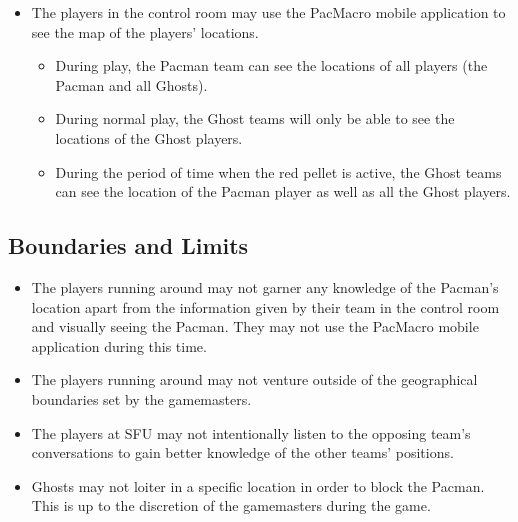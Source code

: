 \documentclass[10pt, oneside, letterpaper, titlepage]{article}
\begin{document}
	\begin{itemize}
		\item The players in the control room may use the PacMacro mobile application to see the map of the players' locations.
		\begin{itemize}
			\item During play, the Pacman team can see the locations of all players (the Pacman and all Ghosts).
			\item During normal play, the Ghost teams will only be able to see the locations of the Ghost players.
			\item During the period of time when the red pellet is active, the Ghost teams can see the location of the Pacman player as well as all the Ghost players.
		\end{itemize}
	\end{itemize}

	\subsection{Boundaries and Limits}
	\label{subsec:gameplay:boundaries-and-limits}

	\begin{itemize}
		\item The players running around may not garner any knowledge of the Pacman's location apart from the information given by their team in the control room and visually seeing the Pacman. They may not use the PacMacro mobile application during this time.
		\item The players running around may not venture outside of the geographical boundaries set by the gamemasters.
		\item The players at SFU may not intentionally listen to the opposing team's conversations to gain better knowledge of the other teams' positions.
		\item Ghosts may not loiter in a specific location in order to block the Pacman. This is up to the discretion of the gamemasters during the game.
	\end{itemize}
\end{document}
